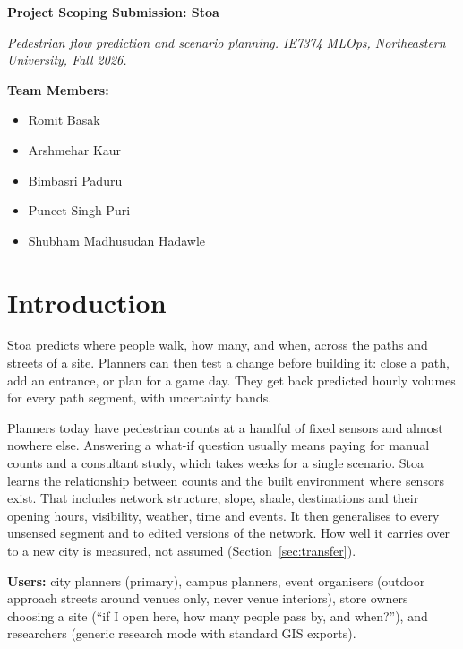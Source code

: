 \documentclass[11pt]{article}
\begin{document}
{\LARGE\bfseries\color{heading} Project Scoping Submission: Stoa}\par
\vspace{2pt}
\textit{Pedestrian flow prediction and scenario planning. IE7374 MLOps, Northeastern University, Fall 2026.}

\textbf{Team Members:}
\begin{itemize}
  \item Romit Basak
  \item Arshmehar Kaur
  \item Bimbasri Paduru
  \item Puneet Singh Puri
  \item Shubham Madhusudan Hadawle
\end{itemize}

\section{Introduction}

Stoa predicts where people walk, how many, and when, across the paths and streets of a site. Planners can then test a change before building it: close a path, add an entrance, or plan for a game day. They get back predicted hourly volumes for every path segment, with uncertainty bands.

Planners today have pedestrian counts at a handful of fixed sensors and almost nowhere else. Answering a what-if question usually means paying for manual counts and a consultant study, which takes weeks for a single scenario. Stoa learns the relationship between counts and the built environment where sensors exist. That includes network structure, slope, shade, destinations and their opening hours, visibility, weather, time and events. It then generalises to every unsensed segment and to edited versions of the network. How well it carries over to a new city is measured, not assumed (Section~\ref{sec:transfer}).

\textbf{Users:} city planners (primary), campus planners, event organisers (outdoor approach streets around venues only, never venue interiors), store owners choosing a site (``if I open here, how many people pass by, and when?''), and researchers (generic research mode with standard GIS exports).
\end{document}
